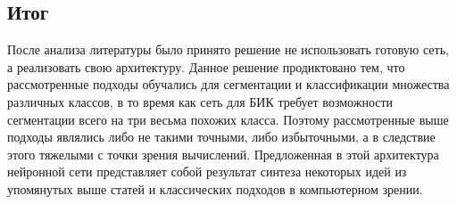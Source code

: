 \subsection{Итог}
После анализа литературы было принято решение не использовать готовую сеть, а реализовать свою архитектуру. Данное решение продиктовано тем, что рассмотренные подходы
обучались для сегментации и классификации множества различных классов, в то время как сеть для БИК требует возможности сегментации всего на три весьма похожих класса. 
Поэтому рассмотренные выше подходы являлись либо не такими точными, либо избыточными, а в следствие этого тяжелыми с точки зрения вычислений.
Предложенная в этой архитектура нейронной сети представляет собой результат синтеза некоторых идей из упомянутых выше статей и классических подходов в компьютерном зрении.

